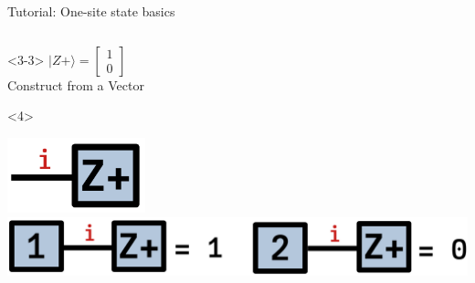 \begin{frame}[fragile]{Tutorial: One-site state basics}
\begin{columns}
\begin{column}[T]{0.48\textwidth}
\begin{onlyenv}<3-3>
$|Z+\rangle = \begin{bmatrix} 1 \\ 0 \end{bmatrix}$ \\[\baselineskip]
Construct from a Vector
\end{onlyenv}
\begin{onlyenv}<4>
\begin{center}
\includegraphics[width=0.3\textwidth]{
  slides/assets/Zp.png
} \\
\includegraphics[width=1.0\textwidth]{
  slides/assets/Zp_elts.png
}
\end{center}
\end{onlyenv}
\end{column}

\end{columns}

\end{frame}
